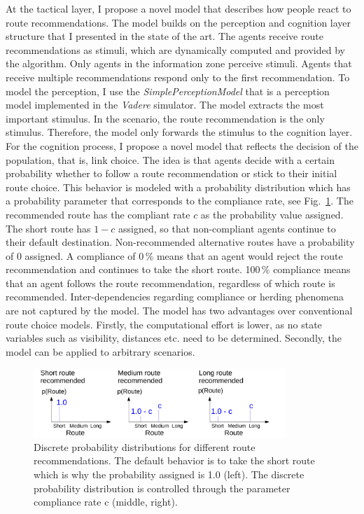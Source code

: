 At the tactical layer, I propose a novel model that describes how people react to route recommendations. The model builds on the perception and cognition layer structure that I presented in the state of the art. The agents receive route recommendations as stimuli, which are dynamically computed and provided by the algorithm. Only agents in the information zone perceive stimuli. Agents that receive multiple recommendations respond only to the first recommendation. To model the perception, I use the \textit{SimplePerceptionModel} that is a perception model implemented in the \textit{Vadere} simulator. The model extracts the most important stimulus. In the scenario, the route recommendation is the only stimulus. Therefore, the model only forwards the stimulus to the cognition layer.
For the cognition process, I propose a novel model that reflects the decision of the population, that is, link choice. The idea is that agents decide with a certain probability whether to follow a route recommendation or stick to their initial route choice. This behavior is modeled with a probability distribution which has a probability parameter that corresponds to the compliance rate, see Fig.~\ref{fig:distsforparameter}. The recommended route has the compliant rate $c$ as the probability value assigned. The short route has $1-c$ assigned, so that non-compliant agents continue to their default destination. Non-recommended alternative routes have a probability of 0 assigned. A compliance of 0\,\% means that an agent would reject the route recommendation and continues to take the short route. 100\,\% compliance means that an agent follows the route recommendation, regardless of which route is recommended. Inter-dependencies regarding compliance or herding phenomena are not captured by the model. The model has two advantages over conventional route choice models. Firstly, the computational effort is lower, as no state variables such as visibility, distances etc. need to be determined. Secondly, the model can be applied to arbitrary scenarios. 

\begin{figure}[hbt!]
\centering
\includegraphics[width=0.85\textwidth]{../figures/investigation/VergleichUmleitalgorithmen/modelroutechoiceprobs.pdf} 
\caption[Discrete probability distributions for different route recommendations]{Discrete probability distributions for different route recommendations.  The default behavior is to take the short route which is why the probability assigned is 1.0 (left). The discrete probability distribution is controlled through the parameter compliance rate c (middle, right). }
\label{fig:distsforparameter}
\end{figure}


